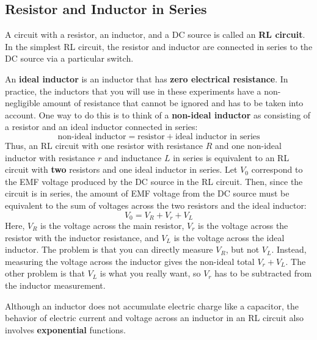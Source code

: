 \subsection{Resistor and Inductor in Series}
A circuit with a resistor, an inductor, and a DC source is called an \textbf{RL circuit}. In the simplest RL circuit, the resistor and inductor are connected in series to the DC source via a particular switch.

An \textbf{ideal inductor} is an inductor that has \textbf{zero electrical resistance}. In practice, the inductors that you will use in these experiments have a non-negligible amount of resistance that cannot be ignored and has to be taken into account. One way to do this is to think of a \textbf{non-ideal inductor} as consisting of a resistor and an ideal inductor connected in series:
\begin{equation}
    \text{non-ideal inductor} = \text{resistor} + \text{ideal inductor in series}
\end{equation}
Thus, an RL circuit with one resistor with resistance $R$ and one non-ideal inductor with resistance $r$ and inductance $L$ in series is equivalent to an RL circuit with \textbf{two} resistors and one ideal inductor in series. Let $V_{0}$ correspond to the EMF voltage produced by the DC source in the RL circuit. Then, since the circuit is in series, the amount of EMF voltage from the DC source must be equivalent to the sum of voltages across the two resistors and the ideal inductor:
\begin{equation}
    V_{0} = V_{R} + V_{r} + V_{L}
\end{equation}
Here, $V_{R}$ is the voltage across the main resistor, $V_{r}$ is the voltage across the resistor with the inductor resistance, and $V_{L}$ is the voltage across the ideal inductor. The problem is that you can directly measure $V_{R}$, but not $V_{L}$. Instead, measuring the voltage across the inductor gives the non-ideal total $V_{r} + V_{L}$. The other problem is that $V_{L}$ is what you really want, so $V_{r}$ has to be subtracted from the inductor measurement.

Although an inductor does not accumulate electric charge like a capacitor, the behavior of electric current and voltage across an inductor in an RL circuit also involves \textbf{exponential} functions.


